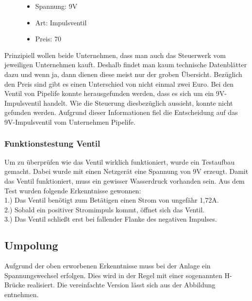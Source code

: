 \begin{figure}
\begin{minipage}[t]{0.45\textwidth}
\begin{itemize}
	\item{Spannung: 9V}
	\item{Art: Impulsventil}
	\item{Preis: 70\textsf{\texteuro}}
\end{itemize}

\end{minipage}
\end{figure} 
Prinzipiell wollen beide Unternehmen, dass man auch das Steuerwerk vom jeweiligen Unternehmen kauft. Deshalb findet man kaum technische Datenblätter dazu und wenn ja, dann dienen diese meist nur der groben Übersicht. Bezüglich den Preis sind gibt es einen Unterschied von nicht einmal zwei Euro. Bei den Ventil von Pipelife konnte herausgefunden werden, dass es sich um ein 9V-Impulsventil handelt. Wie die Steuerung diesbezüglich aussieht, konnte nicht gefunden werden. Aufgrund dieser Informationen fiel die Entscheidung auf das 9V-Impulsventil vom Unternehmen Pipelife.

\subsubsection{Funktionstestung Ventil}
\label{sec:funktionstestungVentil}

Um zu überprüfen wie das Ventil wirklich funktioniert, wurde ein Testaufbau gemacht. Dabei wurde mit einen Netzgerät eine Spannung von 9V erzeugt. Damit das Ventil funktioniert, muss ein gewisser Wasserdruck vorhanden sein. Aus dem Test wurden folgende Erkenntnisse gewonnen: \\

1.) Das Ventil benötigt zum Betätigen einen Strom von ungefähr 1,72A. \\

2.) Sobald ein positiver Stromimpuls kommt, öffnet sich das Ventil.\\

3.) Das Ventil schließt erst bei fallender Flanke des negativen Impulses.

\subsection{Umpolung}
\label{sec:umpolung}

Aufgrund der oben erworbenen Erkenntnisse muss bei der Anlage ein Spannungswechsel erfolgen. Dies wird in der Regel mit einer sogenannten H-Brücke realisiert. Die vereinfachte Version lässt sich aus der Abbildung entnehmen. 

